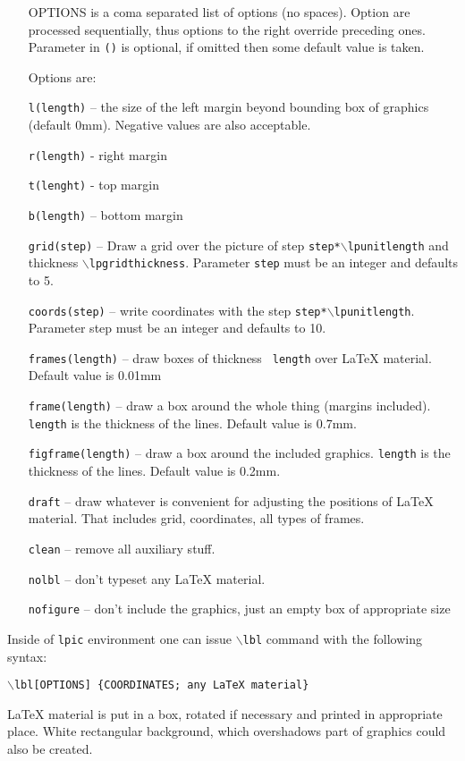 \documentclass[10pt]{amsart}
\def\cmd#1{\texttt{$\backslash$#1}}
\let\latex=\LaTeX
\begin{document}
\begin{itemize}
  \vspace{2mm}
  \item[\sc OPTIONS] is a coma separated list of options (no spaces). 
    Option are processed
    sequentially, thus options to the right override preceding ones.
    Parameter in \texttt{()} is optional, if omitted then some default
    value is taken.
    
    Options are:
    	\item[\texttt{l(length)}] -- the size of the left margin beyond
			bounding box of graphics (default
                        0mm). Negative values are also acceptable.
	\item[\texttt{r(length)}] - right margin 
	\item[\texttt{t(lenght)}] - top margin
	\item[\texttt{b(length)}] -- bottom margin
	\item[\texttt{grid(step)}] -- Draw a grid over the picture of
			step \texttt{step*}\cmd{lpunitlength} and
			thickness \cmd{lpgridthickness}.  Parameter
			\texttt{step} must be an integer and defaults to 5.
        \item[\texttt{coords(step)}] -- write coordinates with the step
			\texttt{step*}\cmd{lpunitlength}.  Parameter step
			must be an integer and defaults to 10.
        \item[\texttt{frames(length)}] -- draw boxes of thickness {\tt
			length} over \latex{} material. Default value is
			0.01mm
	\item[\texttt{frame(length)}] -- draw a box around the whole
			thing (margins included). \texttt{length} is the
			thickness of the lines.  Default value is
			0.7mm.
        \item[\texttt{figframe(length)}] -- draw a box around the
			included graphics.  \texttt{length} is the
			thickness of the lines.  Default value is
			0.2mm.
        \item[\texttt{draft}] -- draw whatever is convenient for
			adjusting the positions of \latex{}
			material. That includes grid, coordinates, all
			types of frames.
	\item[\texttt{clean}] -- remove all auxiliary stuff.
	\item[\texttt{nolbl}] -- don't typeset any \latex{} material.
	\item[\texttt{nofigure}] -- don't include the graphics, just an
			empty box of appropriate size
  
\end{itemize}
  \vspace{2mm}\par\noindent
  Inside of \texttt{lpic} environment one can issue \cmd{lbl} command
    with the following syntax:\vspace{2mm}\par 
    \texttt{\cmd{lbl}[{\sc OPTIONS}]%
      \{{\sc COORDINATES; any \latex{} material}\}}
     \vspace{2mm}\par\noindent  
    \latex{} material is put in a box, rotated if necessary and printed
    in appropriate place. White rectangular background, which overshadows part of graphics could also be created.
\end{document}
